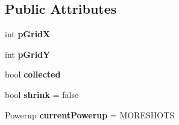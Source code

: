\subsection*{Public Attributes}
\begin{DoxyCompactItemize}
\item 
\mbox{\label{class_powerups_a92d156191f1cbda81d58142d20ee40e6}} 
int {\bfseries p\+GridX}
\item 
\mbox{\label{class_powerups_a01b555def1e4bdad60723b8577735ebc}} 
int {\bfseries p\+GridY}
\item 
\mbox{\label{class_powerups_a7e6e32d10f34b6c01c54d0e62a35a056}} 
bool {\bfseries collected}
\item 
\mbox{\label{class_powerups_aa7db9d8070d760ea6ad99a0f2d7656fd}} 
bool {\bfseries shrink} = false
\item 
\mbox{\label{class_powerups_aa5ed86bb691ba0010e5464f631984f82}} 
Powerup {\bfseries current\+Powerup} = M\+O\+R\+E\+S\+H\+O\+TS
\end{DoxyCompactItemize}
